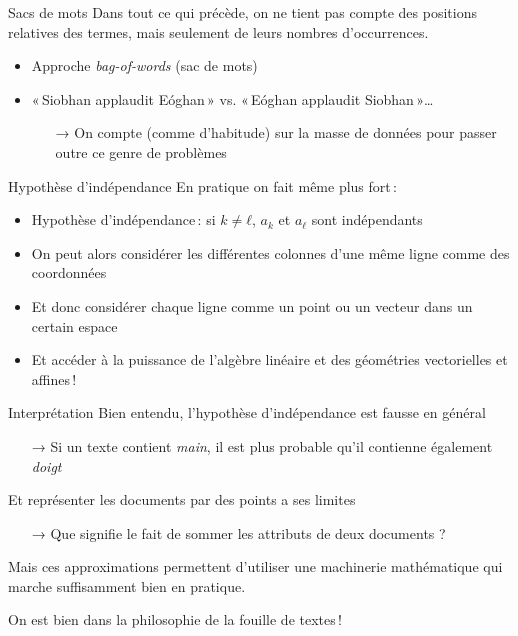 \documentclass[../allslides.tex]{subfiles}
\begin{document}
\begin{frame}{Sacs de mots}
	Dans tout ce qui précède, on ne tient pas compte des positions relatives des termes, mais seulement de leurs nombres d'occurrences.
	\begin{itemize}
		\item Approche \alert{\emph{bag-of-words}} (sac de mots)
		\item « Siobhan applaudit Eóghan » vs. « Eóghan applaudit Siobhan »…
		\begin{itemize}
			\item[→] On compte (comme d'habitude) sur la \alert{masse} de données pour passer outre ce genre de problèmes
		\end{itemize}
	\end{itemize}
\end{frame}

\begin{frame}{Hypothèse d'indépendance}
	En pratique on fait même plus fort :
	\begin{itemize}[<+->]
		\item Hypothèse d'\alert{indépendance} : si \(k≠ℓ\), \(a_k\) et \(a_ℓ\) sont indépendants
		\item On peut alors considérer les différentes colonnes d'une même ligne comme des coordonnées
		\item Et donc considérer chaque ligne comme un \alert{point} ou un \alert{vecteur} dans un certain espace
		\item Et accéder à la puissance de l'algèbre linéaire et des géométries vectorielles et affines !
	\end{itemize}
\end{frame}

\begin{frame}{Interprétation}
	Bien entendu, l'hypothèse d'indépendance est \alert{fausse} en général
	\begin{itemize}
		\item[→] Si un texte contient \emph{main}, il est plus probable qu'il contienne également \emph{doigt}
	\end{itemize}
	Et représenter les documents par des points a ses limites
	\begin{itemize}
		\item[→] Que signifie le fait de sommer les attributs de deux documents ?
	\end{itemize}
	Mais ces approximations permettent d'utiliser une machinerie mathématique qui marche suffisamment bien en pratique.

	On est bien dans la philosophie de la fouille de textes !
\end{frame}
\end{document}
